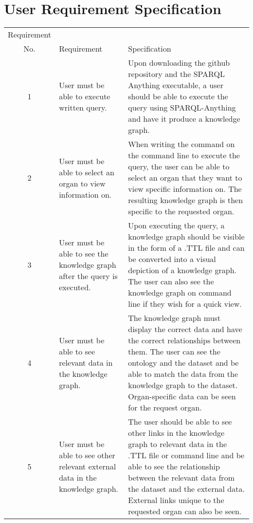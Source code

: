 \begin{table}[h!]
\section{User Requirement Specification}
\begin{center}
\begin{tabular}{c|p{2in}p{2.55in}}
Requirement \\ No.&Requirement&Specification\\\hline 

1&
User must be able to execute written query. & 
Upon downloading the github repository and the SPARQL Anything executable, a user should be able to execute the query using SPARQL-Anything and have it produce a knowledge graph. \\

2& 
User must be able to select an organ to view information on. &
When writing the command on the command line to execute the query, the user can be able to select an organ that they want to view specific information on. The resulting knowledge graph is then specific to the requested organ. \\

3&
User must be able to see the knowledge graph after the query is executed. &
Upon executing the query, a knowledge graph should be visible in the form of a .TTL file and can be converted into a visual depiction of a knowledge graph. The user can also see the knowledge graph on command line if they wish for a quick view.\\

4&
User must be able to see relevant data in the knowledge graph. & 
The knowledge graph must display the correct data and have the correct relationships between them. The user can see the ontology and the dataset and be able to match the data from the knowledge graph to the dataset. Organ-specific data can be seen for the request organ.\\

5&
User must be able to see other relevant external data in the knowledge graph. & 
The user should be able to see other links in the knowledge graph to relevant data in the .TTL file or command line and be able to see the relationship between the relevant data from the dataset and the external data. External links unique to the requested organ can also be seen. 

\end{tabular}
\end{center}
\end{table}

